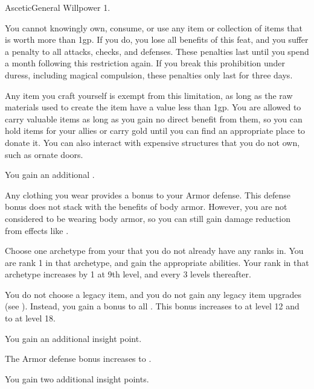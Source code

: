   \begin{feat}{Ascetic}{General}
    \featpre Willpower 1.

     You cannot knowingly own, consume, or use any item or collection of items that is worth more than 1gp.
    If you do, you lose all benefits of this feat, and you suffer a  penalty to all attacks, checks, and defenses.
    These penalties last until you spend a month following this restriction again.
    If you break this prohibition under duress, including magical compulsion, these penalties only last for three days.

    Any item you craft yourself is exempt from this limitation, as long as the raw materials used to create the item have a value less than 1gp.
    You are allowed to carry valuable items as long as you gain no direct benefit from them, so you can hold items for your allies or carry gold until you can find an appropriate place to donate it.
    You can also interact with expensive structures that you do not own, such as ornate doors.

     You gain an additional .

     Any clothing you wear provides a  bonus to your Armor defense.
    This defense bonus does not stack with the benefits of body armor.
    However, you are not considered to be wearing body armor, so you can still gain damage reduction from effects like .

     Choose one archetype from your  that you do not already have any
    ranks in.
    You are rank 1 in that archetype, and gain the appropriate abilities.
    Your rank in that archetype increases by 1 at 9th level, and every 3 levels thereafter.

     You do not choose a legacy item, and you do not gain any legacy item upgrades (see ).
    Instead, you gain a  bonus to all .
    This bonus increases to  at level 12 and to  at level 18.

     You gain an additional insight point.

     The Armor defense bonus increases to .

     You gain two additional insight points.
  \end{feat}

